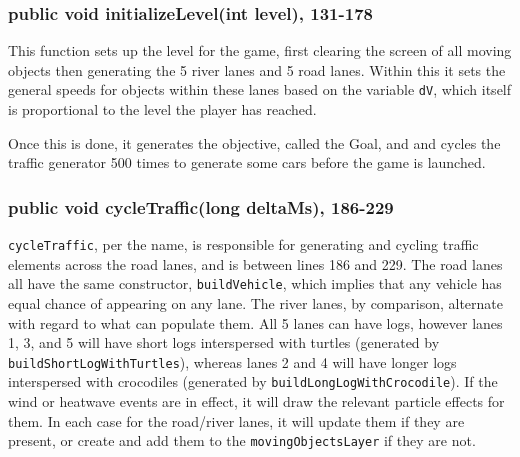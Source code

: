 \documentclass[12pt]{article}
\begin{document}
\subsubsection{public void initializeLevel(int level), 131-178}
This function sets up the level for the game, first clearing the screen of all moving objects then generating the 5 river lanes and 5 road lanes.
Within this it sets the general speeds for objects within these lanes based on the variable \verb|dV|, which itself is proportional to the level the player has reached.

Once this is done, it generates the objective, called the Goal, and and cycles the traffic generator 500 times to generate some cars before the game is launched.

\subsubsection{public void cycleTraffic(long deltaMs), 186-229}
\verb|cycleTraffic|, per the name, is responsible for generating and cycling traffic elements across the road lanes, and is between lines 186 and 229.
The road lanes all have the same constructor, \verb|buildVehicle|, which implies that any vehicle has equal chance of appearing on any lane.
The river lanes, by comparison, alternate with regard to what can populate them.
All 5 lanes can have logs, however lanes 1, 3, and 5 will have short logs interspersed with turtles (generated by \verb|buildShortLogWithTurtles|), whereas lanes 2 and 4 will have longer logs interspersed with crocodiles (generated by \verb|buildLongLogWithCrocodile|).
If the wind or heatwave events are in effect, it will draw the relevant particle effects for them.
In each case for the road/river lanes, it will update them if they are present, or create and add them to the \verb|movingObjectsLayer| if they are not.
\end{document}
